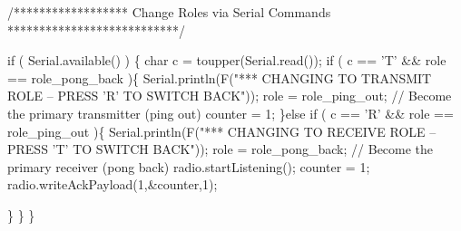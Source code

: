 \begin{DoxyCodeInclude}
\textcolor{comment}{/****************** Change Roles via Serial Commands ***************************/}

  \textcolor{keywordflow}{if} ( Serial.available() )
  \{
    \textcolor{keywordtype}{char} c = toupper(Serial.read());
    \textcolor{keywordflow}{if} ( c == \textcolor{charliteral}{'T'} && role == role\_pong\_back )\{      
      Serial.println(F(\textcolor{stringliteral}{"*** CHANGING TO TRANSMIT ROLE -- PRESS 'R' TO SWITCH BACK"}));
      role = role\_ping\_out;  \textcolor{comment}{// Become the primary transmitter (ping out)}
      counter = 1;
   \}\textcolor{keywordflow}{else}
    \textcolor{keywordflow}{if} ( c == \textcolor{charliteral}{'R'} && role == role\_ping\_out )\{
      Serial.println(F(\textcolor{stringliteral}{"*** CHANGING TO RECEIVE ROLE -- PRESS 'T' TO SWITCH BACK"}));      
       role = role\_pong\_back; \textcolor{comment}{// Become the primary receiver (pong back)}
       radio.startListening();
       counter = 1;
       radio.writeAckPayload(1,&counter,1);
       
    \}
  \}
\}
\end{DoxyCodeInclude}
 